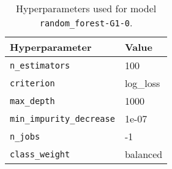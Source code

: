 \begin{table}[H]
\centering
\capstart
\begin{tabularx}{0.48\textwidth}{|X|l|}
\hline
Hyperparameter & Value \\
\hline
\texttt{n\_estimators} & 100 \\
\texttt{criterion} & log\_loss \\
\texttt{max\_depth} & 1000 \\
\texttt{min\_impurity\_decrease} & 1e-07 \\
\texttt{n\_jobs} & -1 \\
\texttt{class\_weight} & balanced \\
\hline
\end{tabularx}
\caption{Hyperparameters used for model \texttt{random\_forest-G1-0}.}
\label{tab:hyperparameters_best_random_forest}

\end{table}

